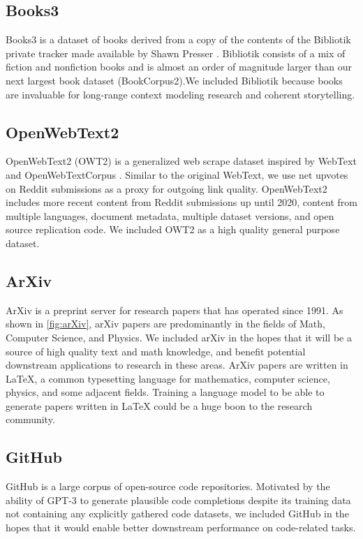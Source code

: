 \documentclass[11pt,a4paper]{article}
\begin{document}
\subsection{Books3}

Books3 is a dataset of books derived from a copy of the contents of the Bibliotik private tracker made available by Shawn Presser \citep{bibliotik}. Bibliotik consists of a mix of fiction and nonfiction books and is almost an order of magnitude larger than our next largest book dataset (BookCorpus2).We included Bibliotik because books are invaluable for long-range context modeling research and coherent storytelling.

\subsection{OpenWebText2}

OpenWebText2 (OWT2) is a generalized web scrape dataset inspired by WebText \citep{GPT2} and OpenWebTextCorpus \citep{OpenWeb}. Similar to the original WebText, we use net upvotes on Reddit submissions as a proxy for outgoing link quality. OpenWebText2 includes more recent content from Reddit submissions up until 2020, content from multiple languages, document metadata, multiple dataset versions, and open source replication code. We included OWT2 as a high quality general purpose dataset.

\subsection{ArXiv}

ArXiv is a preprint server for research papers that has operated since 1991. As shown in \cref{fig:arXiv}, arXiv papers are predominantly in the fields of Math, Computer Science, and Physics. We included arXiv in the hopes that it will be a source of high quality text and math knowledge, and benefit potential downstream applications to research in these areas. ArXiv papers are written in LaTeX, a common typesetting language for mathematics, computer science, physics, and some adjacent fields. Training a language model to be able to generate papers written in LaTeX could be a huge boon to the research community.

\subsection{GitHub}

GitHub is a large corpus of open-source code repositories. Motivated by the ability of GPT-3 \citep{GPT3} to generate plausible code completions despite its training data not containing any explicitly gathered code datasets, we included GitHub in the hopes that it would enable better downstream performance on code-related tasks.
\end{document}
